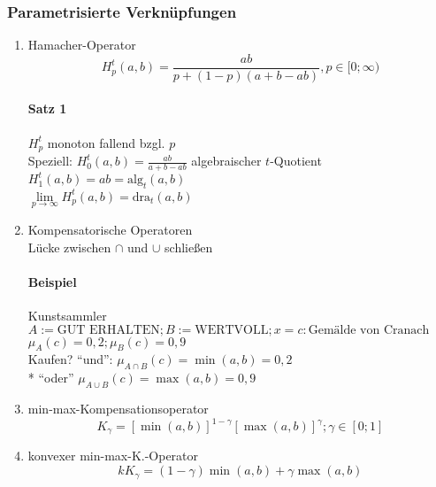 \documentclass[a4paper]{scrartcl}
\begin{document}
\subsubsection{Parametrisierte Verknüpfungen}
\begin{enumerate}
\item Hamacher-Operator
\[ H_p^t (a,b) = \frac{ab}{p + (1-p) (a+b - ab)}, p \in [0;\infty)\]
\paragraph{Satz 1} $H_p^t$ monoton fallend bzgl. $p$\\
Speziell: $H_0^t (a,b) = \frac{ab}{a+b -ab}$ algebraischer $t$-Quotient\\
$H_1^t (a,b) = ab = \text{alg}_t (a,b)$\\
$\lim\limits_{p \to \infty} H_p^t (a,b)= \text{dra}_t (a,b)$

\item Kompensatorische Operatoren\\
Lücke zwischen $\cap$ und $\cup$ schließen
\paragraph{Beispiel} Kunstsammler\\
$A := \text{GUT ERHALTEN}; B:= \text{WERTVOLL}; x=c: \text{Gemälde von Cranach}$\\
$\mu_A(c) = 0,2 ; \mu_B(c) = 0,9$\\
Kaufen? "`und"': $\mu_{A \cap B} (c) = \min (a,b) = 0,2$\\*
"`oder"' $\mu_{A \cup B} (c) = \max (a,b) = 0,9$

\item min-max-Kompensationsoperator
\[ K_\gamma = [ \min (a,b) ]^{1-\gamma} [\max(a,b)]^\gamma ; \gamma \in [0;1]\]
\item konvexer min-max-K.-Operator
\[ kK_\gamma = (1 - \gamma) \min (a,b) + \gamma \max (a,b)\]
\end{enumerate}
\end{document}
